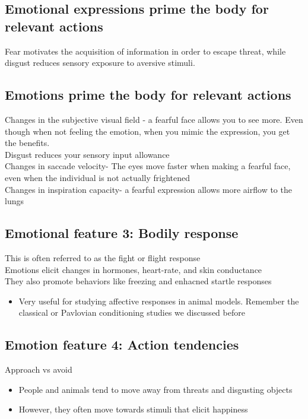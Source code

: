 \subsection{Emotional expressions prime the body for relevant actions}
Fear motivates the acquisition of information in order to escape threat, while disgust reduces sensory exposure to aversive stimuli.

\subsection{Emotions prime the body for relevant actions
}Changes in the subjective visual field - a fearful face allows you to see more. Even though when  not feeling the emotion, when you mimic the expression, you get the benefits.
\\Disgust reduces your sensory input allowance
\\Changes in saccade  velocity- The eyes move faster when making a fearful face, even when the individual is not actually frightened
\\Changes in inspiration capacity- a fearful expression allows more airflow to the lungs


\subsection{Emotional feature 3: Bodily response}
This is often referred to as the fight or flight response
\\Emotions elicit changes in hormones, heart-rate, and skin conductance
\\They also promote behaviors like freezing and enhacned startle responses
\begin{itemize}
    \item Very useful for studying affective responses in animal models. Remember the classical or Pavlovian conditioning studies we discussed before
\end{itemize}
\subsection{Emotion feature 4: Action tendencies}
Approach vs avoid
\begin{itemize}
    \item People and animals tend to move away from threats and disgusting objects
    \item However, they often move towards stimuli that elicit happiness
\end{itemize}
